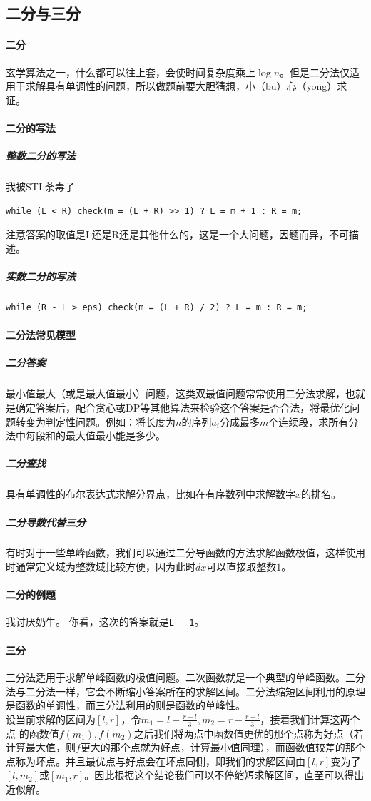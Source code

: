 \documentclass[]{cpp}
\begin{document}
\subsection{二分与三分}
\paragraph{二分} 玄学算法之一，什么都可以往上套，会使时间复杂度乘上$\log{n}$。但是二分法仅适用于求解具有单调性的问题，所以做题前要大胆猜想，小（bu）心（yong）求证。
\paragraph{二分的写法}
\subparagraph{整数二分的写法}
	我被STL荼毒了
	\begin{verbatim}while (L < R) check(m = (L + R) >> 1) ? L = m + 1 : R = m;\end{verbatim}
	注意答案的取值是L还是R还是其他什么的，这是一个大问题，因题而异，不可描述。
\subparagraph{实数二分的写法} \begin{verbatim}while (R - L > eps) check(m = (L + R) / 2) ? L = m : R = m;\end{verbatim}
\paragraph{二分法常见模型}
\subparagraph{二分答案}
	最小值最大（或是最大值最小）问题，这类双最值问题常常使用二分法求解，也就是确定答案后，配合贪心或DP等其他算法来检验这个答案是否合法，将最优化问题转变为判定性问题。例如：将长度为$n$的序列$a_i$分成最多$m$个连续段，求所有分法中每段和的最大值最小能是多少。
\subparagraph{二分查找}
	具有单调性的布尔表达式求解分界点，比如在有序数列中求解数字$x$的排名。
\subparagraph{二分导数代替三分}
	有时对于一些单峰函数，我们可以通过二分导函数的方法求解函数极值，这样使用时通常定义域为整数域比较方便，因为此时$dx$可以直接取整数$1$。
\paragraph{二分的例题} 我讨厌奶牛。
	你看，这次的答案就是\verb|L - 1|。
\paragraph{三分}
	三分法适用于求解单峰函数的极值问题。二次函数就是一个典型的单峰函数。三分法与二分法一样，它会不断缩小答案所在的求解区间。二分法缩短区间利用的原理是函数的单调性，而三分法利用的则是函数的单峰性。\\
	设当前求解的区间为$[l,r]$，令$m_1=l+\frac{r-l}{3},m_2=r-\frac{r-l}{3}$，接着我们计算这两个点
的函数值$f(m_1),f(m_2)$之后我们将两点中函数值更优的那个点称为好点（若计算最大值，则$f$更大的那个点就为好点，计算最小值同理），而函数值较差的那个点称为坏点。并且最优点与好点会在坏点同侧，即我们的求解区间由$[l,r]$变为了$[l,m_2]$或$[m_1,r]$。因此根据这个结论我们可以不停缩短求解区间，直至可以得出近似解。
\end{document}
